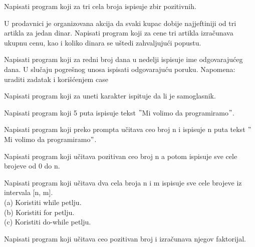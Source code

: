 \begin{primer}
Napisati program koji za tri cela broja ispisuje zbir
pozitivnih.
\end{primer}

\begin{primer}
U prodavnici je organizovana akcija da svaki kupac dobije
najjeftiniji od tri artikla za jedan dinar. Napisati program koji za cene
tri artikla izračunava ukupnu cenu, kao i koliko dinara se uštedi zahvaljujući
popustu.
\end{primer}


\begin{primer}
Napisati program koji za redni broj dana u nedelji ispisuje
ime odgovarajućeg dana. U slučaju pogrešnog unosa ispisati odgovarajuću
poruku. Napomena: uraditi zadatak i korišćenjem case
\end{primer}

\begin{primer}
Napisati program koji za uneti karakter ispituje da li je
samoglasnik.
\end{primer}

\begin{primer}
Napisati program koji 5 puta ispisuje tekst $"$Mi volimo da
programiramo$"$.
\end{primer}

\begin{primer}
Napisati program koji preko prompta učitava ceo broj n i ispisuje n puta
tekst $"$Mi volimo da
programiramo$"$.
\end{primer}

\begin{primer}
Napisati program koji učitava pozitivan ceo broj n a potom
ispisuje sve cele brojeve od 0 do n.
\end{primer}

\begin{primer}
Napisati program koji učitava dva cela broja n i m ispisuje
sve cele brojeve iz intervala [n, m].\\
(a) Koristiti while petlju.\\
(b) Koristiti for petlju.\\
(c) Koristiti do-while petlju.\\
\end{primer}

\begin{primer}
Napisati program koji učitava ceo pozitivan broj i izračunava
njegov faktorijal. 
\end{primer}

